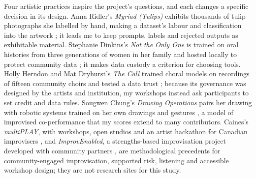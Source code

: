 Four artistic practices inspire the project's questions, and each changes a
specific decision in its design. Anna Ridler's
\emph{Myriad (Tulips)} exhibits thousands of tulip photographs she labelled
by hand, making a dataset's labour and classification into the artwork
\citep{ridler2018}; it leads me to keep prompts, labels and rejected outputs
as exhibitable material. Stephanie Dinkins's \emph{Not the Only One} is
trained on oral histories from three generations of women in her family and
hosted locally to protect community data \citep{dinkins_ntoo}; it makes data
custody a criterion for choosing tools. Holly Herndon and Mat Dryhurst's
\emph{The Call} trained choral models on recordings of fifteen community
choirs and tested a data trust \citep{herndon2024call}; because its
governance was designed by the artists and institution, my workshops
instead ask participants to set credit and data rules. Sougwen Chung's
\emph{Drawing Operations} pairs her drawing with robotic systems trained on
her own drawings and gestures \citep{chung_dou}, a model of improvised
co-performance that my scores extend to many contributors. Caines's \emph{multiPLAY}, with workshops, open studios and an
artist hackathon for Canadian improvisers \citep{multiplay}, and
\emph{ImprovEnabled}, a strengths-based improvisation project developed with
community partners \citep{improvenabled}, are methodological precedents for
community-engaged improvisation, supported risk, listening and accessible
workshop design; they are not research sites for this study.
